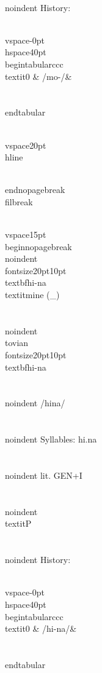 \\noindent History:

\\vspace{-0pt}
\\hspace{40pt}
\\begin{tabular}{ccc}
\\textit{0} & /mo-/& \\\\
\\end{tabular}

\\vspace{20pt}\\hline

\\end{nopagebreak}
\\filbreak



\\vspace{15pt}
\\begin{nopagebreak}
\\noindent{\\fontsize{20pt}{10pt}\\textbf{hi-na} } \\textit{mine} (_)\\\\
\\noindent {\\tovian \\fontsize{20pt}{10pt} \\textbf{hi-na} }\\\\
\\noindent /h{\textprimstress}ina/\\\\
\\noindent Syllables: hi.na\\\\
\\noindent lit. GEN+I\\\\
\\noindent \\textit{P}\\\\


\\noindent History:

\\vspace{-0pt}
\\hspace{40pt}
\\begin{tabular}{ccc}
\\textit{0} & /hi-na/& \\\\
\\end{tabular}

